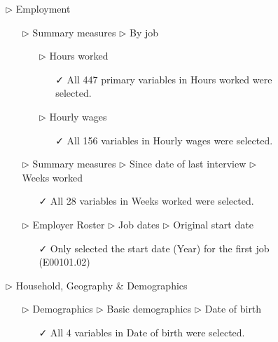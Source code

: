 \documentclass[12pt]{article}
\begin{document}
\begin{figure}[t]
\begin{tcolorbox}[title = Navigating the data source]
\begin{itemize}
\begin{itemize}
\begin{itemize}
\begin{itemize}
\end{itemize}
\end{itemize}
\end{itemize}
\item[$\triangleright$] Employment
\begin{itemize}
\item[$\triangleright$] Summary measures $\triangleright$ By job
\begin{itemize}
\item[$\triangleright$] Hours worked
\begin{itemize}
\item[\faCheck] All 447 primary variables in Hours worked were selected.
\end{itemize}
\item[$\triangleright$] Hourly wages
\begin{itemize}
\item[\faCheck] All 156 variables in Hourly wages were selected.
\end{itemize}
\end{itemize}
\end{itemize}
\begin{itemize}
\item[$\triangleright$] Summary measures $\triangleright$ Since date of last interview $\triangleright$ Weeks worked
\begin{itemize}
\item[\faCheck] All 28 variables in Weeks worked were selected.
\end{itemize}
\end{itemize}
\begin{itemize}
\item[$\triangleright$] Employer Roster $\triangleright$ Job dates $\triangleright$ Original start date
\begin{itemize}
\item[\faCheck] Only selected the start date (Year) for the first job (E00101.02)
\end{itemize}
\end{itemize}
\item[$\triangleright$] Household, Geography \& Demographics
\begin{itemize}
\item[$\triangleright$] Demographics $\triangleright$ Basic demographics $\triangleright$ Date of birth
\begin{itemize}
\item[\faCheck] All 4 variables in Date of birth were selected.
\end{itemize}

\end{itemize}
\end{itemize}
\end{tcolorbox}
\end{figure}
\end{document}
